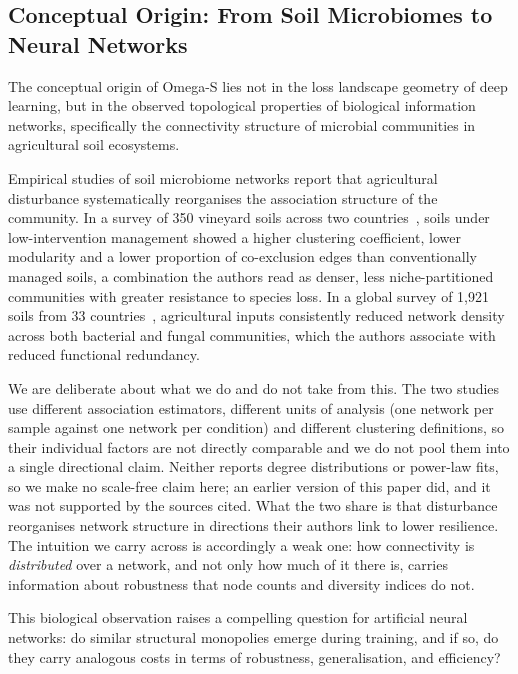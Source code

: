 \documentclass[11pt,a4paper]{article}
\begin{document}
\subsection{Conceptual Origin: From Soil Microbiomes to Neural Networks}

The conceptual origin of Omega-S lies not in the loss landscape geometry
of deep learning, but in the observed topological properties of biological
information networks, specifically the connectivity structure of microbial
communities in agricultural soil ecosystems.

Empirical studies of soil microbiome networks report that agricultural
disturbance systematically reorganises the association structure of the
community. In a survey of 350 vineyard soils across two
countries~\cite{ortiz2021}, soils under low-intervention management showed a
higher clustering coefficient, lower modularity and a lower proportion of
co-exclusion edges than conventionally managed soils, a combination the
authors read as denser, less niche-partitioned communities with greater
resistance to species loss. In a global survey of 1{,}921 soils from 33
countries~\cite{saati2026}, agricultural inputs consistently reduced network
density across both bacterial and fungal communities, which the authors
associate with reduced functional redundancy.

We are deliberate about what we do and do not take from this. The two studies
use different association estimators, different units of analysis (one network
per sample against one network per condition) and different clustering
definitions, so their individual factors are not directly comparable and we do
not pool them into a single directional claim. Neither reports degree
distributions or power-law fits, so we make no scale-free claim here; an
earlier version of this paper did, and it was not supported by the sources
cited. What the two share is that disturbance reorganises network structure in
directions their authors link to lower resilience. The intuition we carry
across is accordingly a weak one: how connectivity is \emph{distributed} over a
network, and not only how much of it there is, carries information about
robustness that node counts and diversity indices do not.

This biological observation raises a compelling question for artificial neural
networks: do similar structural monopolies emerge during training, and if so,
do they carry analogous costs in terms of robustness, generalisation, and
efficiency?
\end{document}
